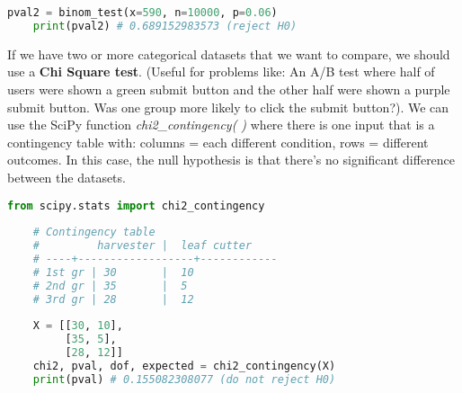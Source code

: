\documentclass[11pt, a4paper]{article}
\begin{document}
\begin{spacing}{1.1}
\begin{lstlisting}[language=Python]
	pval2 = binom_test(x=590, n=10000, p=0.06)
	print(pval2) # 0.689152983573 (reject H0) \end{lstlisting}\vspace*{1mm}
	If we have two or more categorical datasets that we want to compare, we should use a \textbf{Chi Square test}. (Useful for problems like: An A/B test where half of users were shown a green submit button and the other half were shown a purple submit button. Was one group more likely to click the submit button?). We can use the SciPy function \textit{chi2\_contingency( )} where there is one input that is a contingency table with: columns = each different condition, rows = different outcomes. In this case, the null hypothesis is that there’s no significant difference between the datasets.
	\begin{lstlisting}[language=Python]
	from scipy.stats import chi2_contingency
	
	# Contingency table
	#         harvester |  leaf cutter
	# ----+------------------+------------
	# 1st gr | 30       |  10
	# 2nd gr | 35       |  5
	# 3rd gr | 28       |  12
	
	X = [[30, 10],
	     [35, 5],
	     [28, 12]]
	chi2, pval, dof, expected = chi2_contingency(X)
	print(pval) # 0.155082308077 (do not reject H0) \end{lstlisting}\vspace*{4mm}
	

\end{spacing}
\end{document}
